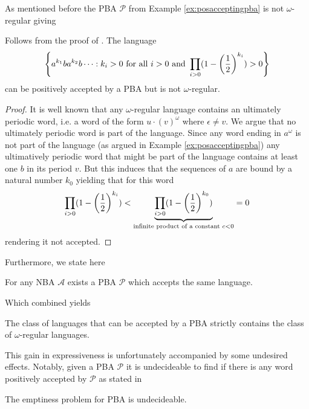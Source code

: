 As mentioned before the \ac{PBA} $\mathcal{P}$ from Example 
\ref{ex:posacceptingpba} is not $\omega$-regular giving
\begin{lemma}
  Follows from the proof of \cite[Theorem 4]{RecOmeLangProbAuto}.
  The language
  \begin{equation*}
    \left\{a^{k_{1}}ba^{k_{2}}b\dots:k_{i}>0\text{ for all }i>0\text{ and }
    \prod_{i>0}(1-\left(\frac{1}{2}\right)^{k_{i}}) > 0\right\}
  \end{equation*}
  can be positively accepted by a \ac{PBA} but is not $\omega$-regular.
\end{lemma}
\begin{proof}
  It is well known that any $\omega$-regular language contains an ultimately
  periodic word, i.e. a word of the form $u\cdot (v)^{\omega}$ where 
  $\epsilon\neq v$. We argue that no ultimately periodic word is part of the
  language. Since any word ending in $a^{\omega}$ is not part of the language
  (as argued in Example \ref{ex:posacceptingpba}) any ultimatively periodic
  word that might be part of the language contains at least one $b$ in its
  period $v$. But this induces that the sequences of $a$ are bound by a natural
  number $k_{0}$ yielding that for this word
  \begin{equation*}
    \prod_{i>0}(1-\left(\frac{1}{2}\right)^{k_{i}}) < 
    \underbrace{\prod_{i>0}(1-\left(\frac{1}{2}\right)^{k_{0}})}_{
      \text{infinite product of a constant }c<0} = 0
  \end{equation*}
  rendering it not accepted.
\end{proof}
Furthermore, we state here
\begin{lemma}
  \cite[Lemma 5]{RecOmeLangProbAuto} For any \ac{NBA} $\mathcal{A}$ exists a
  \ac{PBA} $\mathcal{P}$ which accepts the same language.
\end{lemma}
Which combined yields
\begin{theorem}
  \cite[Theorem 4]{RecOmeLangProbAuto}
  The class of languages that can be accepted by a \ac{PBA} strictly contains
  the class of $\omega$-regular languages.
\end{theorem}

This gain in expressiveness is unfortunately accompanied by some undesired 
effects. Notably, given a \ac{PBA} $\mathcal{P}$ it is undecideable to find if
there is any word positively accepted by $\mathcal{P}$ as stated in
\begin{theorem}
  \cite[Theorem 2]{DecProblemsForProbAuto}
  The emptiness problem for \ac{PBA} is undecideable.
\end{theorem}

